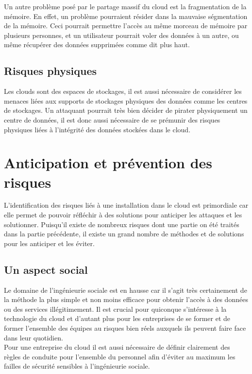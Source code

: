 \documentclass[a4paper, 12pt]{article}
\begin{document}
      Un autre problème posé par le partage massif du cloud est la fragmentation
      de la mémoire. En effet, un problème pourraient résider dans la mauvaise
      ségmentation de la mémoire. Ceci pourrait permettre l'accès au même
      morceau de mémoire par plusieurs personnes, et un utilisateur pourrait
      voler des données à un autre, ou même récupérer des données supprimées
      comme dit plus haut.

    \subsection{Risques physiques}
      Les clouds sont des espaces de stockages, il est aussi nécessaire de
      considérer les menaces liées aux supports de stockages physiques des
      données comme les centres de stockages. Un attaquant pourrait très bien
      décider de pirater physiquement un centre de données, il est donc aussi
      nécessaire de se prémunir des risques physiques liées à l'intégrité des
      données stockées dans le cloud.

  \section{Anticipation et prévention des risques}
      L'identification des risques liés à une installation dans le cloud est
      primordiale car elle permet de pouvoir réfléchir à des solutions pour 
      anticiper les attaques et les solutionner. Puisqu'il existe de nombreux
      risques dont une partie on été traités dans la partie précédente, il 
      existe un grand nombre de méthodes et de solutions pour les anticiper
      et les éviter.

      \subsection{Un aspect social}
      Le domaine de l'ingénieurie sociale est en hausse car il s'agit très 
      certainement de la méthode la plus simple et non moins efficace pour 
      obtenir l'accès à des données ou des services illégitimement. Il est 
      crucial pour quiconque s'intéresse à la technologie du cloud et d'autant
      plus pour les entreprises de se former et de former l'ensemble des 
      équipes au risques bien réels auxquels ils peuvent faire face dans leur 
      quotidien. \\
      
      Pour une entreprise du cloud il est aussi nécessaire de définir 
      clairement des règles de conduite pour l'ensemble du personnel afin
      d'éviter au maximum les failles de sécurité sensibles à l'ingénieurie
      sociale.
\end{document}
